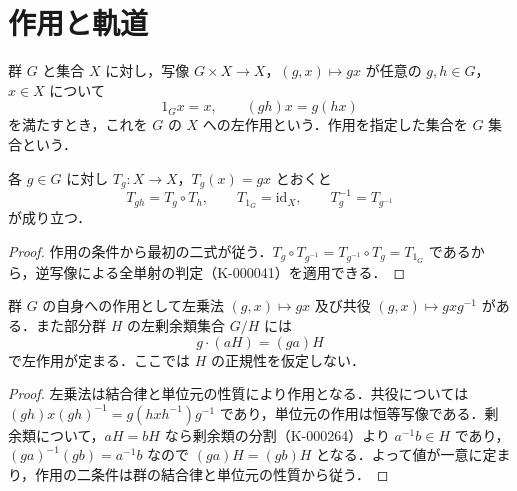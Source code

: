 \section{作用と軌道}
\begin{defn}[群の左作用]
群 $G$ と集合 $X$ に対し，写像 $G\times X\to X$，$(g,x)\mapsto gx$ が任意の $g,h\in G$，$x\in X$ について
\[
1_Gx=x,\qquad (gh)x=g(hx)
\]
を満たすとき，これを $G$ の $X$ への左作用という．作用を指定した集合を $G$ 集合という．
\end{defn}
\begin{prop}[作用による全単射]
各 $g\in G$ に対し $T_g:X\to X$，$T_g(x)=gx$ とおくと
\[
T_{gh}=T_g\circ T_h,\qquad T_{1_G}=\mathrm{id}_X,\qquad T_g^{-1}=T_{g^{-1}}
\]
が成り立つ．
\end{prop}
\begin{proof}
作用の条件から最初の二式が従う．$T_g\circ T_{g^{-1}}=T_{g^{-1}}\circ T_g=T_{1_G}$ であるから，逆写像による全単射の判定（K-000041）を適用できる．
\end{proof}
\begin{prop}[群自身と剰余類集合への作用]
群 $G$ の自身への作用として左乗法 $(g,x)\mapsto gx$ 及び共役 $(g,x)\mapsto gxg^{-1}$ がある．また部分群 $H$ の左剰余類集合 $G/H$ には
\[
g\cdot(aH)=(ga)H
\]
で左作用が定まる．ここでは $H$ の正規性を仮定しない．
\end{prop}
\begin{proof}
左乗法は結合律と単位元の性質により作用となる．共役については $(gh)x(gh)^{-1}=g(hxh^{-1})g^{-1}$ であり，単位元の作用は恒等写像である．剰余類について，$aH=bH$ なら剰余類の分割（K-000264）より $a^{-1}b\in H$ であり，$(ga)^{-1}(gb)=a^{-1}b$ なので $(ga)H=(gb)H$ となる．よって値が一意に定まり，作用の二条件は群の結合律と単位元の性質から従う．
\end{proof}
